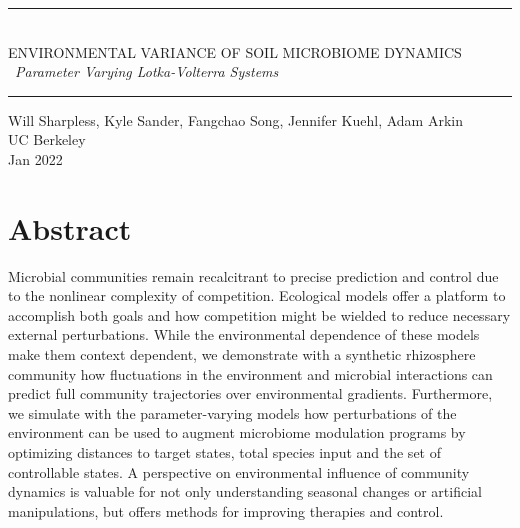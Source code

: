 \documentclass[twocolumn, 10pt]{report}
\newcommand{\HRule}[1]{\rule{\linewidth}{#1}}
\begin{document}
{\selectfont
\begin{titlepage}
    \centering
	\vfill
	\HRule{0.5pt} \\
 	\Large \textsc{} \uppercase{Environmental Variance of Soil Microbiome Dynamics} \\ 
    \ \textit{Parameter Varying Lotka-Volterra Systems}
	\HRule{2pt}
	\vfill
	\small
	Will Sharpless, Kyle Sander, Fangchao Song, Jennifer Kuehl, Adam Arkin \\ UC Berkeley \\ Jan 2022 \\
    \vfill
	\vfill
\end{titlepage}


\newpage



\section*{Abstract}
Microbial communities remain recalcitrant to precise prediction and control due to the nonlinear complexity of competition. Ecological models offer a platform to accomplish both goals and how competition might be wielded to reduce necessary external perturbations. While the environmental dependence of these models make them context dependent, we demonstrate with a synthetic rhizosphere community how fluctuations in the environment and microbial interactions can predict full community trajectories over environmental gradients. Furthermore, we simulate with the parameter-varying models how perturbations of the environment can be used to augment microbiome modulation programs by optimizing distances to target states, total species input and the set of controllable states. A perspective on environmental influence of community dynamics is valuable for not only understanding seasonal changes or artificial manipulations, but offers methods for improving therapies and control.

}
\end{document}
